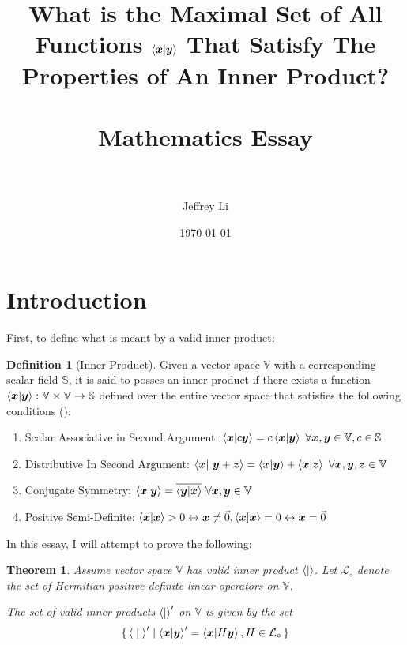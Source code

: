 \documentclass{article}
\title{
  {\LARGE
   \textbf{What is the Maximal Set of All Functions $\braket{\B{x}|\B{y}}$ That Satisfy The Properties of An Inner Product?}
   }\\~\\
   {\large
    Mathematics Essay
   }\\~\\
}
\author{Jeffrey Li}
\date{\today}
\newcommand{\B}[1]{\boldsymbol{#1}}
\newtheorem{theorem}{Theorem}[section]
\theoremstyle{definition}
\newtheorem{definition}{Definition}[section]
\theoremstyle{remark}
\begin{document}
\maketitle
\pagebreak


\tableofcontents
\pagebreak

\section{Introduction}

First, to define what is meant by a valid inner product:
\begin{definition}[Inner Product]
  Given a vector space $\mathbb{V}$ with a corresponding scalar field $\mathbb{S}$, it is said to posses an inner product if there exists
  a function $\braket{\B{x}| \B{y}} : \mathbb{V} \times \mathbb{V} \to \mathbb{S}$ defined over the entire vector space that satisfies the following conditions (\cite{AdvancedCalculus}):
  \begin{enumerate}
    \item Scalar Associative in Second Argument: $\braket{\B{x}|c\B{y}} = c\braket{\B{x}| \B{y}} ~ \forall \B{x}, \B{y} \in \mathbb{V}, c \in \mathbb{S}$
    \item Distributive In Second Argument: $\braket{\B{x}| ~ \B{y} + \B{z}} = \braket{\B{x}| \B{y}} + \braket{\B{x}|\B{z}}  ~ \forall \B{x}, \B{y}, \B{z} \in \mathbb{V}$
    \item Conjugate Symmetry: $\braket{\B{x}| \B{y}} = \overline{\braket{\B{y}|\B{x}}} ~ \forall \B{x}, \B{y} \in \mathbb{V}$
    \item Positive Semi-Definite: $\braket{\B{x}| \B{x}} > 0 \leftrightarrow \B{x} \neq \vec{0}, \braket{\B{x}| \B{x}} = 0 \leftrightarrow \B{x} = \vec{0}$
  \end{enumerate}
  \label{def:InnerProduct}
\end{definition}

In this essay, I will attempt to prove the following:
\begin{theorem}
  Assume vector space $\mathbb{V}$ has valid inner product $\braket{|}$. Let $\mathcal{L}_{\circ}$ denote the 
  set of Hermitian positive-definite linear operators on $\mathbb{V}$.

  The set of valid inner products $\braket{|}^\prime$ on $\mathbb{V}$ is given by the set
  \begin{equation}
    \set{\braket{|}^\prime | \braket{\B{x}|\B{y}}^\prime = \braket{ \B{x} | H \B{y}}, H \in \mathcal{L}_\circ}
  \end{equation}
\end{theorem}
\end{document}
